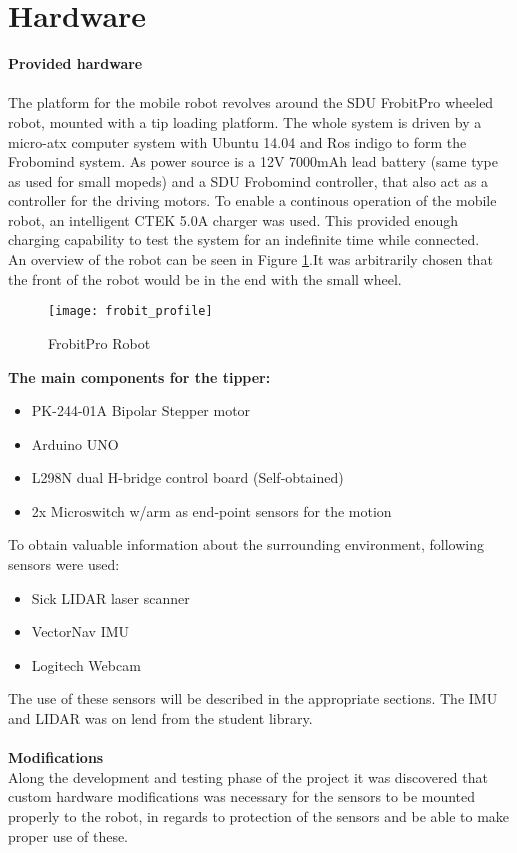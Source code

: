\section{Hardware} %
\label{sec:mr_hardware}

\textbf{Provided hardware}
\\
\\
The platform for the mobile robot revolves around the SDU FrobitPro wheeled 
robot, mounted with a tip loading platform. The whole system is driven 
by a micro-atx computer system with Ubuntu 14.04 and Ros indigo to form the 
Frobomind system. As power source is a 12V 7000mAh lead battery (same type as 
used for 
small mopeds) and a SDU Frobomind controller, that also act as a controller for 
the driving motors. To enable a continous operation of the mobile robot, an 
intelligent CTEK 5.0A charger was used. This provided enough charging 
capability to test the system for an indefinite time while connected.\\ An 
overview of the robot can be seen in Figure \ref{fig:frobit}.It was arbitrarily 
chosen that the front of the robot would be in the end with the small wheel.\\
\begin{figure}[H]
	\centering
	\texttt{[image: frobit\_profile]}
	\caption{FrobitPro Robot}
	\label{fig:frobit}
	\end{figure}
\textbf{The main components for the tipper:}
\begin{itemize}
	\item PK-244-01A Bipolar Stepper motor
	\item Arduino UNO
	\item L298N dual H-bridge control board (Self-obtained)
	\item 2x Microswitch w/arm as end-point sensors for the motion
\end{itemize}   

To obtain valuable information about the surrounding environment, following 
sensors were used:
\begin{itemize}
	\item Sick LIDAR laser scanner
	\item VectorNav	 IMU
	\item Logitech Webcam
\end{itemize} 

The use of these sensors will be described in the appropriate sections. The IMU 
and LIDAR was on lend from the student library.\\
\\
\textbf{Modifications}\\
Along the development and testing phase of the project it was discovered that 
custom hardware modifications was necessary for the sensors to be mounted 
properly to the robot, in regards to protection of the sensors and be able to 
make proper use of these.\\

